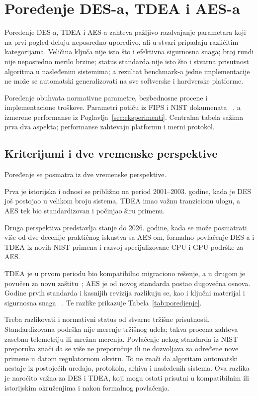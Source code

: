 \section{Poređenje DES-a, TDEA i AES-a}
\label{sec:poredjenje}

Poređenje DES-a, TDEA i AES-a zahteva pažljivo razdvajanje
parametara koji na prvi pogled deluju neposredno uporedivo, ali u
stvari pripadaju različitim kategorijama. Veličina ključa nije isto
što i efektivna sigurnosna snaga; broj rundi nije neposredno merilo
brzine; status standarda nije isto što i stvarna prisutnost algoritma
u nasleđenim sistemima; a rezultat benchmark-a jedne implementacije
ne može se automatski generalizovati na sve softverske i hardverske
platforme.

Poređenje obuhvata normativne parametre, bezbednosne procene i
implementacione troškove. Parametri potiču iz FIPS i NIST dokumenata
~\cite{fips46-3,sp800-67r2,fips197-2023}, a izmerene performanse iz
Poglavlja~\ref{sec:eksperimenti}. Centralna tabela sažima prva dva
aspekta; performanse zahtevaju platformu i merni protokol.

\subsection{Kriterijumi i dve vremenske perspektive}
\label{subsec:poredjenje_kriterijumi}

Poređenje se posmatra iz dve vremenske perspektive.

Prva je istorijska i odnosi se približno na period 2001--2003.
godine, kada je DES još postojao u velikom broju sistema, TDEA imao
važnu tranzicionu ulogu, a AES tek bio standardizovan i počinjao
širu primenu.

Druga perspektiva predstavlja stanje do 2026. godine, kada se može
posmatrati više od dve decenije praktičnog iskustva sa AES-om,
formalno povlačenje DES-a i TDEA iz novih NIST primena i razvoj
specijalizovane CPU i GPU podrške za AES.

TDEA je u prvom periodu bio kompatibilno migraciono rešenje, a u drugom
je povučen za novu zaštitu~\cite{tdea-withdrawal-2023}; AES je od novog
standarda postao dugovečna osnova. Godine prvih standarda i kasnijih
revizija razlikuju se, kao i ključni materijal i sigurnosna snaga
~\cite{fips197-2023,sp800-57pt1r5}. Te razlike prikazuje
Tabela~\ref{tab:poredjenje}.

Treba razlikovati i normativni status od stvarne tržišne prisutnosti. Standardizovana podrška nije merenje
tržišnog udela; takva procena zahteva zasebnu telemetriju ili mrežna merenja.
Povlačenje nekog standarda iz NIST preporuka znači da se više ne
preporučuje ili ne dozvoljava za određene nove primene u datom
regulatornom okviru. To ne znači da algoritam automatski nestaje iz
postojećih uređaja, protokola, arhiva i nasleđenih sistema. Ova
razlika je naročito važna za DES i TDEA, koji mogu ostati prisutni
u kompatibilnim ili istorijskim okruženjima i nakon formalnog
povlačenja.


